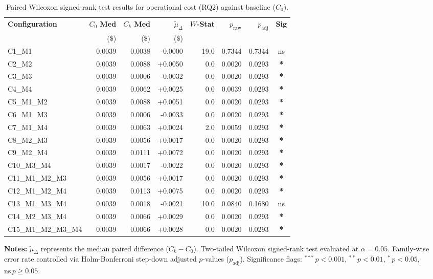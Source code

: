 \begin{table}[!htbp]
\centering
\small
\caption{Paired Wilcoxon signed-rank test results for operational cost (RQ2) against baseline ($C_0$).}
\label{tab:wilcoxon_rq2}
\begin{tabular*}{\textwidth}{@{\extracolsep{\fill}} l r r r r r r c @{}}
\toprule
\textbf{Configuration} & \textbf{$C_0$ Med} & \textbf{$C_k$ Med} & \textbf{$\tilde{\mu}_\Delta$} & \textbf{$W$-Stat} & \textbf{$p_{\text{raw}}$} & \textbf{$p_{\text{adj}}$} & \textbf{Sig} \\
 & \scriptsize{(\$)} & \scriptsize{(\$)} & \scriptsize{(\$)} & & & & \\
\midrule
C1\_M1 & 0.0039 & 0.0038 & -0.0000 & 19.0 & 0.7344 & 0.7344 & ns \\
C2\_M2 & 0.0039 & 0.0088 & +0.0050 & 0.0 & 0.0020 & 0.0293 & \textbf{*} \\
C3\_M3 & 0.0039 & 0.0006 & -0.0032 & 0.0 & 0.0020 & 0.0293 & \textbf{*} \\
C4\_M4 & 0.0039 & 0.0062 & +0.0025 & 0.0 & 0.0039 & 0.0293 & \textbf{*} \\
C5\_M1\_M2 & 0.0039 & 0.0088 & +0.0051 & 0.0 & 0.0020 & 0.0293 & \textbf{*} \\
C6\_M1\_M3 & 0.0039 & 0.0006 & -0.0033 & 0.0 & 0.0020 & 0.0293 & \textbf{*} \\
C7\_M1\_M4 & 0.0039 & 0.0063 & +0.0024 & 2.0 & 0.0059 & 0.0293 & \textbf{*} \\
C8\_M2\_M3 & 0.0039 & 0.0056 & +0.0017 & 0.0 & 0.0020 & 0.0293 & \textbf{*} \\
C9\_M2\_M4 & 0.0039 & 0.0111 & +0.0072 & 0.0 & 0.0020 & 0.0293 & \textbf{*} \\
C10\_M3\_M4 & 0.0039 & 0.0017 & -0.0022 & 0.0 & 0.0020 & 0.0293 & \textbf{*} \\
C11\_M1\_M2\_M3 & 0.0039 & 0.0056 & +0.0017 & 0.0 & 0.0020 & 0.0293 & \textbf{*} \\
C12\_M1\_M2\_M4 & 0.0039 & 0.0113 & +0.0075 & 0.0 & 0.0020 & 0.0293 & \textbf{*} \\
C13\_M1\_M3\_M4 & 0.0039 & 0.0018 & -0.0021 & 10.0 & 0.0840 & 0.1680 & ns \\
C14\_M2\_M3\_M4 & 0.0039 & 0.0066 & +0.0029 & 0.0 & 0.0020 & 0.0293 & \textbf{*} \\
C15\_M1\_M2\_M3\_M4 & 0.0039 & 0.0066 & +0.0028 & 0.0 & 0.0020 & 0.0293 & \textbf{*} \\
\bottomrule
\end{tabular*}
\vspace{0.5em}
\parbox{\textwidth}{\footnotesize
\textbf{Notes:} $\tilde{\mu}_\Delta$ represents the median paired difference ($C_k - C_0$). Two-tailed Wilcoxon signed-rank test evaluated at $\alpha = 0.05$. Family-wise error rate controlled via Holm-Bonferroni step-down adjusted $p$-values ($p_{\text{adj}}$). Significance flags: $^{***}\,p < 0.001$, $^{**}\,p < 0.01$, $^{*}\,p < 0.05$, $\text{ns}\,p \ge 0.05$.}
\end{table}
